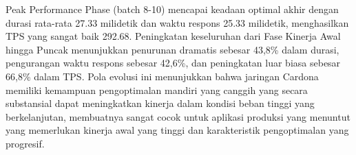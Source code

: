 Peak Performance Phase (batch 8-10) mencapai keadaan optimal akhir dengan durasi rata-rata 27.33 milidetik dan waktu respons 25.33 milidetik, menghasilkan TPS yang sangat baik 292.68. Peningkatan keseluruhan dari Fase Kinerja Awal hingga Puncak menunjukkan penurunan dramatis sebesar 43,8\% dalam durasi, pengurangan waktu respons sebesar 42,6\%, dan peningkatan luar biasa sebesar 66,8\% dalam TPS. Pola evolusi ini menunjukkan bahwa jaringan Cardona memiliki kemampuan pengoptimalan mandiri yang canggih yang secara substansial dapat meningkatkan kinerja dalam kondisi beban tinggi yang berkelanjutan, membuatnya sangat cocok untuk aplikasi produksi yang menuntut yang memerlukan kinerja awal yang tinggi dan karakteristik pengoptimalan yang progresif.